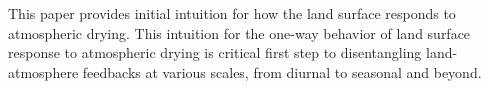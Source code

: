 \documentclass[draft,linenumbers]{agujournal}
\begin{document}
This paper provides initial intuition for how the land surface responds to atmospheric drying. This intuition for the one-way behavior of  land surface response to atmospheric drying is critical first step to disentangling land-atmosphere feedbacks at various scales, from diurnal to seasonal and beyond. 

%
%
%
%
%
%
%
%

%
% 
\end{document}
